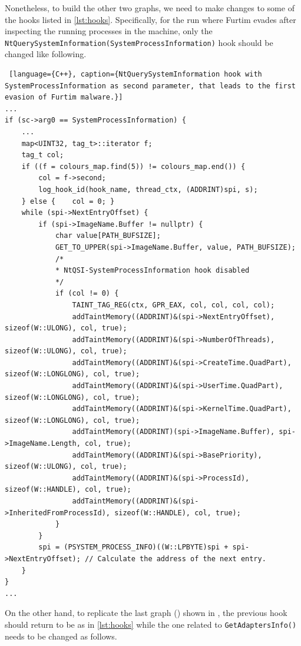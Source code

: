 \documentclass[LaM,binding=0.6cm]{sapthesis}
\begin{document}
Nonetheless, to build the other two graphs, we need to make changes to some of the hooks listed in \ref{lst:hooks}. Specifically, for the run where Furtim evades after inspecting the running processes in the machine, only the \texttt{NtQuerySystemInformati\-on(SystemProcessInformation)} hook should be changed like following.
\begin{lstlisting} [language={C++}, caption={NtQuerySystemInformation hook with SystemProcessInformation as second parameter, that leads to the first evasion of Furtim malware.}]
...
if (sc->arg0 == SystemProcessInformation) {
	...
	map<UINT32, tag_t>::iterator f;
	tag_t col;
	if ((f = colours_map.find(5)) != colours_map.end()) {
		col = f->second;
		log_hook_id(hook_name, thread_ctx, (ADDRINT)spi, s);
	} else {	col = 0; }
	while (spi->NextEntryOffset) {
		if (spi->ImageName.Buffer != nullptr) {	
			char value[PATH_BUFSIZE];
			GET_TO_UPPER(spi->ImageName.Buffer, value, PATH_BUFSIZE);
			/*
			* NtQSI-SystemProcessInformation hook disabled
			*/
			if (col != 0) {
				TAINT_TAG_REG(ctx, GPR_EAX, col, col, col, col);
				addTaintMemory((ADDRINT)&(spi->NextEntryOffset), sizeof(W::ULONG), col, true);
				addTaintMemory((ADDRINT)&(spi->NumberOfThreads), sizeof(W::ULONG), col, true);
				addTaintMemory((ADDRINT)&(spi->CreateTime.QuadPart), sizeof(W::LONGLONG), col, true);
				addTaintMemory((ADDRINT)&(spi->UserTime.QuadPart), sizeof(W::LONGLONG), col, true);
				addTaintMemory((ADDRINT)&(spi->KernelTime.QuadPart), sizeof(W::LONGLONG), col, true);
				addTaintMemory((ADDRINT)(spi->ImageName.Buffer), spi->ImageName.Length, col, true);
				addTaintMemory((ADDRINT)&(spi->BasePriority), sizeof(W::ULONG), col, true);
				addTaintMemory((ADDRINT)&(spi->ProcessId), sizeof(W::HANDLE), col, true);
				addTaintMemory((ADDRINT)&(spi->InheritedFromProcessId), sizeof(W::HANDLE), col, true);	
			}
		}
		spi = (PSYSTEM_PROCESS_INFO)((W::LPBYTE)spi + spi->NextEntryOffset); // Calculate the address of the next entry.
	}
}
...
\end{lstlisting}
On the other hand, to replicate the last graph () shown in , the previous hook should return to be as in \ref{lst:hooks} while the one related to \texttt{GetAdaptersInfo()} needs to be changed as follows.
\end{document}
